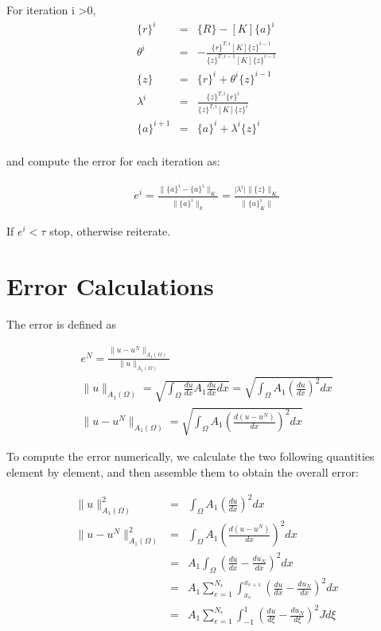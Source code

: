 \documentclass[paper=a4, fontsize=11pt]{article} %
\begin{document}
For iteration i >0, 
\begin{eqnarray}
\{r\}^i &=& \{R\} - [K] \{a\}^i \nonumber\\
\theta^i &=& - \frac{\{r\}^{T,i} [K] \{z\} ^ {i-1}} {\{z\} ^{T,i-1} [K] \{z\}^{i-1} }\nonumber\\
\{z\} &=& \{r\} ^i + \theta ^i \{z\} ^{i-1} \nonumber\\
\lambda ^i &=& \frac{ \{z\}^{T,i} \{r\}^i} { \{z\}^{T,i}[K]\{z\}^i} \nonumber\\
\{a\} ^{i+1} &=& \{a\} ^i + \lambda ^i \{z\} ^i  \nonumber\\
\end{eqnarray}

and compute the error for each iteration as:

\begin{eqnarray}
e^i = \frac{\|\{a\}^i - \{a\}^i \| _K } { \| \{ a\}^i \| _k} = \frac{ \mid \lambda ^i \mid \| \{z\} \| _K }{ \| \{ a\} ^i _K \|} 
\end{eqnarray}

If $e^i < \tau$ stop, otherwise reiterate. 

\section{Error Calculations}
The error is defined as 

\begin{eqnarray}
e^N = \frac{\| u -u^N \| _{A_1(\Omega)}} {\| u \| _{A_1 (\Omega)}} \nonumber\\
\| u \| _{A_1 (\Omega)} = \sqrt{\int_{\Omega} \frac{du}{dx} A_1 \frac{du}{dx} dx} = \sqrt{\int_{\Omega} A_1(\frac{du}{dx})^2 dx}\nonumber\\
\| u -u^N \| _{A_1(\Omega)} = \sqrt{\int_{\Omega} A_1 (\frac{d(u-u^N)}{dx})^2 dx}
\end{eqnarray}

To compute the error numerically, we calculate the two following quantities element by element, and then assemble them to obtain the overall error:

\begin{eqnarray}
\| u \| _{A_1 (\Omega)}^2 &=&\int_{\Omega} A_1(\frac{du}{dx})^2 dx\nonumber\\
\| u -u^N \| _{A_1(\Omega)} ^2 &=& \int_{\Omega} A_1 (\frac{d(u-u^N)}{dx})^2 dx\nonumber\\
&=& A_1 \int_{\Omega} (\frac{du}{dx} - \frac{du_N}{dx})^2 dx\nonumber\\
&=& A_1 \sum_{e=1}^{N_e} \int_{x_e}^{x_{e+1}} (\frac{du}{dx} - \frac{du_N}{dx})^2 dx \nonumber\\
&=& A_1 \sum_{e=1}^{N_e} \int_{-1}^{1} (\frac{du}{d\xi} - \frac{du_N}{d\xi})^2 J d\xi
\end{eqnarray}
\end{document}
